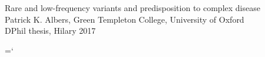 
\begin{romanpages}

\maketitle





\begin{savequote}[15cm]\larger\sffamily\vspace*{-15mm}
{\larger Rare and low-frequency variants and predisposition to complex disease} \\
Patrick K. Albers, Green Templeton College, University of Oxford \\
DPhil thesis, Hilary 2017
\end{savequote}
\begin{abstract}%
{%
%
\vspace{-2.5mm}%
%
}
\end{abstract}%

\begin{acknowledgements}

\end{acknowledgements}


\dominitoc%

{
\small
{}
\hyphenchar{} %

\tableofcontents
\listoffigures
\mtcaddchapter%
\listoftables
\mtcaddchapter%

\hyphenchar\font=`\- %
}

\end{romanpages}

\flushbottom
